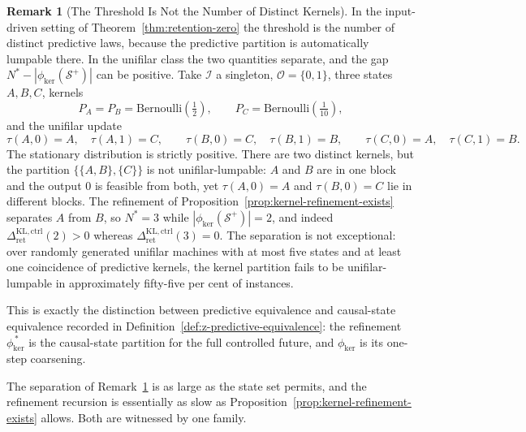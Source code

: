 \documentclass[12pt]{article}
\theoremstyle{definition}
\newtheorem{remark}[theorem]{Remark}
\newcommand{\Splus}{\mathcal S^{+}}
\newcommand{\RetKLc}{\Delta_{\mathrm{ret}}^{\mathrm{KL,ctrl}}}
\begin{document}
\begin{remark}[The Threshold Is Not the Number of Distinct Kernels]
\label{rem:controlled-zero-not-kernels}
In the input-driven setting of Theorem~\ref{thm:retention-zero} the threshold
is the number of distinct predictive laws, because the predictive partition is
automatically lumpable there.  In the unifilar class the two quantities
separate, and the gap $N^{\ast}-|\phi_{\ker}(\Splus)|$ can be positive.  Take $\mathcal I$ a singleton, $\mathcal O=\{0,1\}$, three states
$A,B,C$, kernels
\[
P_A=P_B=\mathrm{Bernoulli}(\tfrac12),
\qquad
P_C=\mathrm{Bernoulli}(\tfrac1{10}),
\]
and the unifilar update
\[
\tau(A,0)=A,\quad\tau(A,1)=C,\qquad
\tau(B,0)=C,\quad\tau(B,1)=B,\qquad
\tau(C,0)=A,\quad\tau(C,1)=B .
\]
The stationary distribution is strictly positive.  There are two distinct
kernels, but the partition $\{\{A,B\},\{C\}\}$ is not unifilar-lumpable: $A$ and
$B$ are in one block and the output $0$ is feasible from both, yet
$\tau(A,0)=A$ and $\tau(B,0)=C$ lie in different blocks.  The refinement of
Proposition~\ref{prop:kernel-refinement-exists} separates $A$ from $B$, so
$N^{\ast}=3$ while $|\phi_{\ker}(\Splus)|=2$, and indeed
$\RetKLc(2)>0$ whereas $\RetKLc(3)=0$.  The
separation is not exceptional: over randomly generated unifilar machines with
at most five states and at least one coincidence of predictive kernels, the
kernel partition fails to be unifilar-lumpable in approximately fifty-five per
cent of instances.

This is exactly the distinction between predictive equivalence and causal-state
equivalence recorded in Definition~\ref{def:z-predictive-equivalence}: the
refinement $\phi_{\ker}^{\,\ast}$ is the causal-state partition for the full
controlled future, and $\phi_{\ker}$ is its one-step coarsening.
\end{remark}

The separation of Remark~\ref{rem:controlled-zero-not-kernels} is as large as
the state set permits, and the refinement recursion is essentially as slow as
Proposition~\ref{prop:kernel-refinement-exists} allows.  Both are witnessed by
one family.
\end{document}
